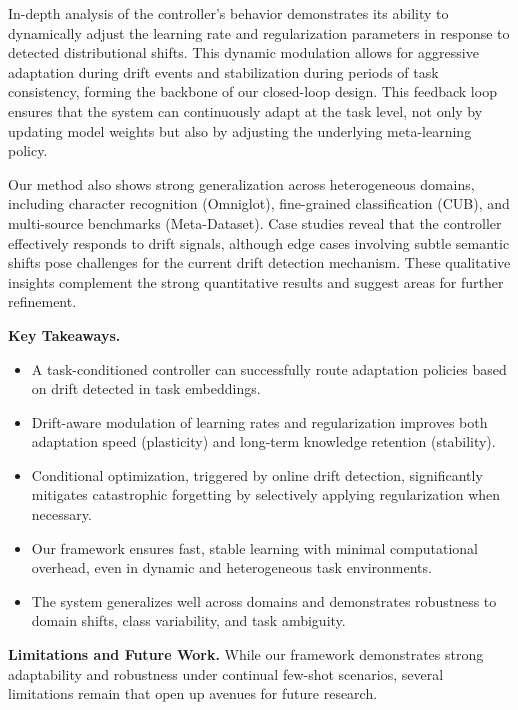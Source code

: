 \documentclass[conference]{IEEEtran}
\begin{document}
In-depth analysis of the controller’s behavior demonstrates its ability to dynamically adjust the learning rate and regularization parameters in response to detected distributional shifts. This dynamic modulation allows for aggressive adaptation during drift events and stabilization during periods of task consistency, forming the backbone of our closed-loop design. This feedback loop ensures that the system can continuously adapt at the task level, not only by updating model weights but also by adjusting the underlying meta-learning policy.

Our method also shows strong generalization across heterogeneous domains, including character recognition (Omniglot), fine-grained classification (CUB), and multi-source benchmarks (Meta-Dataset). Case studies reveal that the controller effectively responds to drift signals, although edge cases involving subtle semantic shifts pose challenges for the current drift detection mechanism. These qualitative insights complement the strong quantitative results and suggest areas for further refinement.

\vspace{0.5em}
\noindent\textbf{Key Takeaways.}
\begin{itemize}
\item A task-conditioned controller can successfully route adaptation policies based on drift detected in task embeddings.
\item Drift-aware modulation of learning rates and regularization improves both adaptation speed (plasticity) and long-term knowledge retention (stability).
\item Conditional optimization, triggered by online drift detection, significantly mitigates catastrophic forgetting by selectively applying regularization when necessary.
\item Our framework ensures fast, stable learning with minimal computational overhead, even in dynamic and heterogeneous task environments.
\item The system generalizes well across domains and demonstrates robustness to domain shifts, class variability, and task ambiguity.
\end{itemize}

\vspace{0.5em}
\noindent\textbf{Limitations and Future Work.}  
While our framework demonstrates strong adaptability and robustness under continual few-shot scenarios, several limitations remain that open up avenues for future research.
\end{document}
